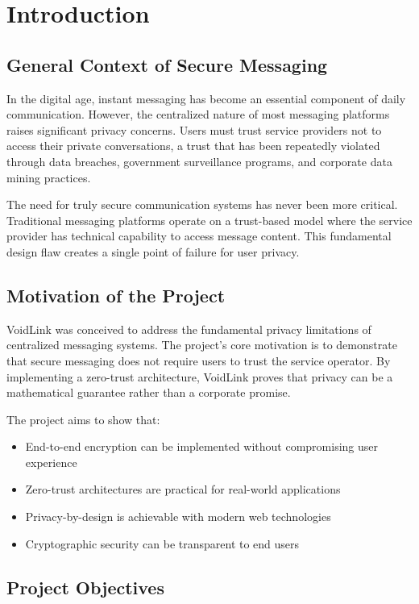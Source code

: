 \chapter*{Introduction}

\section*{General Context of Secure Messaging}

In the digital age, instant messaging has become an essential component of daily communication. However, the centralized nature of most messaging platforms raises significant privacy concerns. Users must trust service providers not to access their private conversations, a trust that has been repeatedly violated through data breaches, government surveillance programs, and corporate data mining practices.

The need for truly secure communication systems has never been more critical. Traditional messaging platforms operate on a trust-based model where the service provider has technical capability to access message content. This fundamental design flaw creates a single point of failure for user privacy.

\section*{Motivation of the Project}

VoidLink was conceived to address the fundamental privacy limitations of centralized messaging systems. The project's core motivation is to demonstrate that secure messaging does not require users to trust the service operator. By implementing a zero-trust architecture, VoidLink proves that privacy can be a mathematical guarantee rather than a corporate promise.

The project aims to show that:
\begin{itemize}
    \item End-to-end encryption can be implemented without compromising user experience
    \item Zero-trust architectures are practical for real-world applications
    \item Privacy-by-design is achievable with modern web technologies
    \item Cryptographic security can be transparent to end users
\end{itemize}

\section*{Project Objectives}

